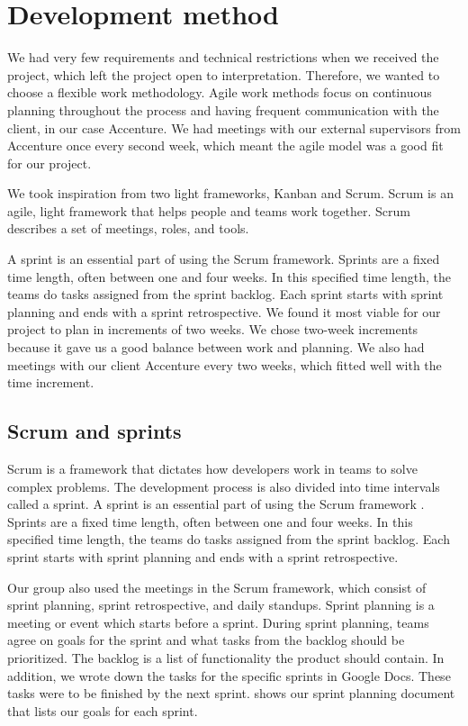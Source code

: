 \section{Development method}
We had very few requirements and technical restrictions when we received the project, which left the project open to interpretation. Therefore, we wanted to choose a flexible work methodology. Agile work methods focus on continuous planning throughout the process and having frequent communication with the client, in our case Accenture. We had meetings with our external supervisors from Accenture once every second week, which meant the agile model was a good fit for our project.

We took inspiration from two light frameworks, Kanban and Scrum. Scrum is an agile,  light framework that helps people and teams work together. Scrum describes a set of meetings, roles, and tools. 

A sprint is an essential part of using the Scrum framework. Sprints are a fixed time length, often between one and four weeks. In this specified time length, the teams do tasks assigned from the sprint backlog. Each sprint starts with sprint planning and ends with a sprint retrospective. We found it most viable for our project to plan in increments of two weeks. We chose two-week increments because it gave us a good balance between work and planning. We also had meetings with our client Accenture every two weeks, which fitted well with the time increment.   

\subsection{Scrum and sprints}\label{section:scrum}
Scrum is a framework that dictates how developers work in teams to solve complex problems. The development process is also divided into time intervals called a sprint. A sprint is an essential part of using the Scrum framework \parencite{prosjektveilederen}. Sprints are a fixed time length, often between one and four weeks. In this specified time length, the teams do tasks assigned from the sprint backlog. Each sprint starts with sprint planning and ends with a sprint retrospective.

Our group also used the meetings in the Scrum framework, which consist of sprint planning, sprint retrospective, and daily standups. Sprint planning is a meeting or event which starts before a sprint. During sprint planning, teams agree on goals for the sprint and what tasks from the backlog should be prioritized. The backlog is a list of functionality the product should contain. In addition, we wrote down the tasks for the specific sprints in Google Docs. These tasks were to be finished by the next sprint.  shows our sprint planning document that lists our goals for each sprint.

